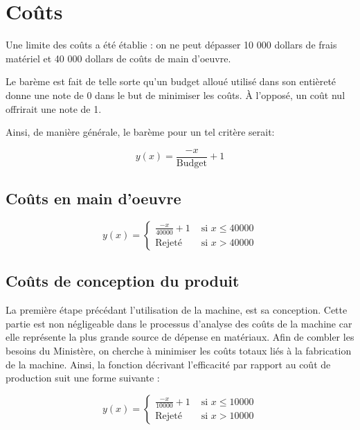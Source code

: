 \section{Coûts}

Une limite des coûts a été établie : on ne peut dépasser 10 000 dollars de frais matériel et 40 000 dollars de coûts de main d'oeuvre. 

Le barème est fait de telle sorte qu'un budget alloué utilisé dans son entièreté donne une note de 0 dans le but de minimiser les coûts. À l'opposé, un coût nul offrirait une note de 1.

Ainsi, de manière générale, le barème pour un tel critère serait:

\begin{equation}
    y(x)=\frac{-x}{\text{Budget}} + 1
\end{equation}

\subsection{Coûts en main d'oeuvre}

\begin{equation}
y(x) = \begin{cases}
        \frac{-x}{40000} + 1 & \text{ si } x \leq 40000\\
        \text{Rejeté} & \text{ si } x > 40000
    \end{cases}
    \label{eq:bareme_cout_logiciel}
\end{equation}

\subsection{Coûts de conception du produit}

La première étape précédant l’utilisation de la machine, est sa conception. Cette partie est non négligeable dans le processus d’analyse des coûts de la machine car elle représente la plus grande source de dépense en matériaux. Afin de combler les besoins du Ministère, on cherche à minimiser les coûts totaux liés à la fabrication de la machine. %
Ainsi, la fonction décrivant l’efficacité par rapport au coût de production suit une forme suivante :

\begin{equation}
y(x) = \begin{cases}
        \frac{-x}{10000} + 1 & \text{ si } x \leq 10000\\
        \text{Rejeté} & \text{ si } x > 10000
    \end{cases}
    \label{eq:bareme_cout_materiel}
\end{equation}

